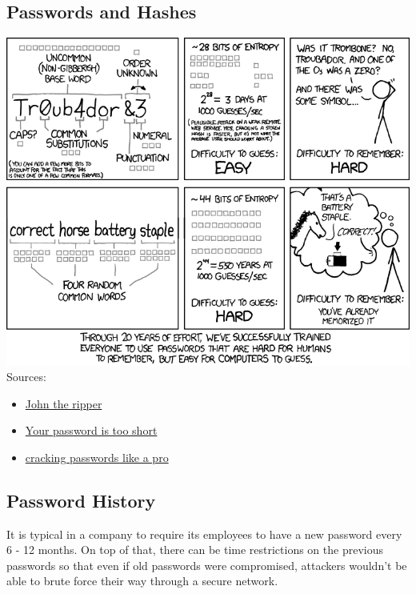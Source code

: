 \documentclass[a4paper, titlepage]{article}
\begin{document}
\subsection{Passwords and Hashes}
\includegraphics[width=\textwidth]{password_strength}
Sources:
\begin{itemize}
    \item \href{http://www.unixmen.com/john-the-ripper-the-fast-multi-platform-password-cracking-tool/}{John the ripper}
    \item \href{http://blog.codinghorror.com/your-password-is-too-damn-short/}{Your password is too short}
    \item \href{http://null-byte.wonderhowto.com/how-to/hack-like-pro-crack-passwords-part-1-principles-technologies-0156136/}{cracking passwords like a pro}

\end{itemize}
\subsection{Password History}

It is typical in a company to require its employees to have a new password every 6 - 12 months. On top of that, there can be time restrictions on the previous passwords so that even if old passwords were compromised, attackers wouldn't be able to brute force their way through a secure network.
\end{document}
